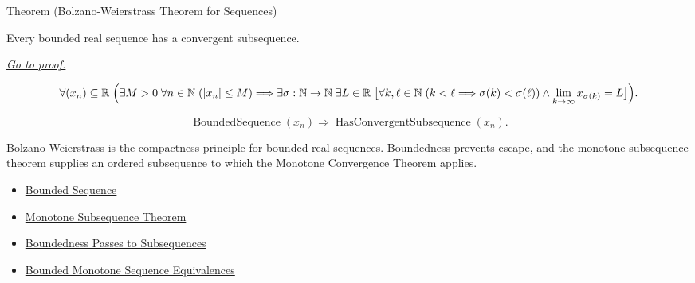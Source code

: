 
\begin{theorembox}{Theorem (Bolzano-Weierstrass Theorem for Sequences)}
\begin{theorem}
\label{thm:bolzano-weierstrass-sequences}
Every bounded real sequence has a convergent subsequence.

\smallskip
\noindent
\hyperref[prf:bolzano-weierstrass-sequences]{\textit{Go to proof.}}
\end{theorem}
\end{theorembox}

\begin{remark*}
\[
\forall (x_n)\subseteq\mathbb{R}\;
\Bigl(
  \exists M>0\;\forall n\in\mathbb{N}\;(|x_n|\le M)
  \Longrightarrow
  \exists \sigma:\mathbb{N}\to\mathbb{N}\;\exists L\in\mathbb{R}\;
  \bigl[
    \forall k,\ell\in\mathbb{N}\;(k<\ell\Longrightarrow\sigma(k)<\sigma(\ell))
    \land
    \lim_{k\to\infty}x_{\sigma(k)}=L
  \bigr]
\Bigr).
\]
\end{remark*}

\begin{remark*}
\[
\operatorname{BoundedSequence}(x_n)
\Longrightarrow
\operatorname{HasConvergentSubsequence}(x_n).
\]
\end{remark*}

\begin{remark*}[Interpretation]
Bolzano-Weierstrass is the compactness principle for bounded real sequences.
Boundedness prevents escape, and the monotone subsequence theorem supplies an
ordered subsequence to which the Monotone Convergence Theorem applies.
\end{remark*}

\begin{dependencies}
\begin{itemize}
  \item \hyperref[def:bounded-sequence]{Bounded Sequence}
  \item \hyperref[thm:monotone-subsequence-theorem]{Monotone Subsequence Theorem}
  \item \hyperref[thm:boundedness-passes-to-subsequences]{Boundedness Passes to Subsequences}
  \item \hyperref[thm:bounded-monotone-sequence-equivalences]{Bounded Monotone Sequence Equivalences}
\end{itemize}
\end{dependencies}

